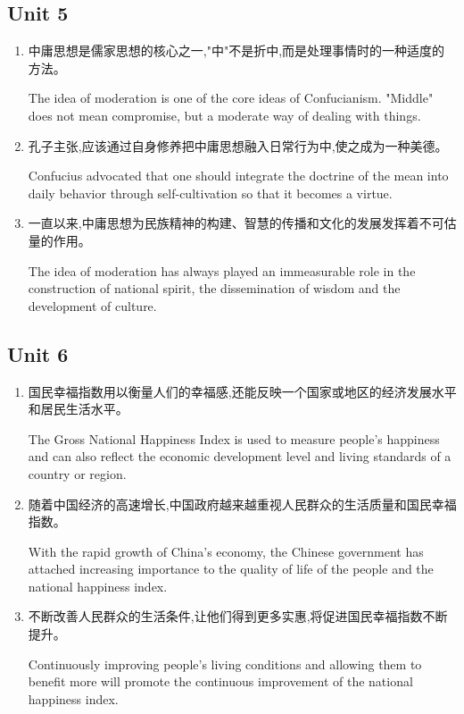 \subsection{Unit 5}
\begin{enumerate}
	\item 中庸思想是儒家思想的核心之一,"中"不是折中,而是处理事情时的一种适度的方法。
	
	The idea of ​​moderation is one of the core ideas of Confucianism. "Middle" does not mean compromise, but a moderate way of dealing with things.
	
	\item 孔子主张,应该通过自身修养把中庸思想融入日常行为中,使之成为一种美德。
	
	Confucius advocated that one should integrate the doctrine of the mean into daily behavior through self-cultivation so that it becomes a virtue.
	
	\item 一直以来,中庸思想为民族精神的构建、智慧的传播和文化的发展发挥着不可估量的作用。
	
	The idea of ​​moderation has always played an immeasurable role in the construction of national spirit, the dissemination of wisdom and the development of culture.
	
\end{enumerate}

\subsection{Unit 6}
\begin{enumerate}
	\item 国民幸福指数用以衡量人们的幸福感,还能反映一个国家或地区的经济发展水平和居民生活水平。
	
	The Gross National Happiness Index is used to measure people's happiness and can also reflect the economic development level and living standards of a country or region.
	
	\item 随着中国经济的高速增长,中国政府越来越重视人民群众的生活质量和国民幸福指数。
	
	With the rapid growth of China's economy, the Chinese government has attached increasing importance to the quality of life of the people and the national happiness index.
	
	\item 不断改善人民群众的生活条件,让他们得到更多实惠,将促进国民幸福指数不断提升。
	
	Continuously improving people's living conditions and allowing them to benefit more will promote the continuous improvement of the national happiness index.
	
\end{enumerate}

